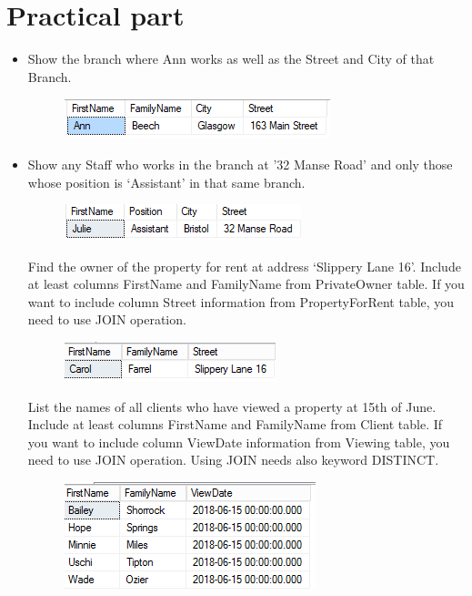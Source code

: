 \documentclass[12pt,a4paper]{article}
\begin{document}
\section{Practical part}
\begin{itemize}
\item Show the branch where Ann works as well as the Street and City
of that Branch.
\begin{figure}[hbtp]
	\includegraphics[scale=1]{1-Ann-branch.PNG}
	\end{figure}
\item Show any Staff who works in the branch at ’32 Manse Road’ and only those
whose position is ‘Assistant’ in that same branch.
\begin{figure}[hbtp]
	\includegraphics[scale=1]{2-branch-position.PNG}
	\end{figure}
Find the owner of the property for rent at address ‘Slippery Lane 16’.
Include at least columns FirstName and FamilyName from PrivateOwner
table. If you want to include column Street information from PropertyForRent
table, you need to use JOIN operation.
\begin{figure}[hbtp]
	\includegraphics[scale=1]{3-owner-street.PNG}
	\end{figure}
List the names of all clients who have viewed a property at 15th of June.
Include at least columns FirstName and FamilyName from Client table. If you
want to include column ViewDate information from Viewing table, you need to
use JOIN operation. Using JOIN needs also keyword DISTINCT.
\begin{figure}[hbtp]
	\includegraphics[scale=1]{4-viewdate.PNG}

\end{figure}
\end{itemize}
\end{document}
